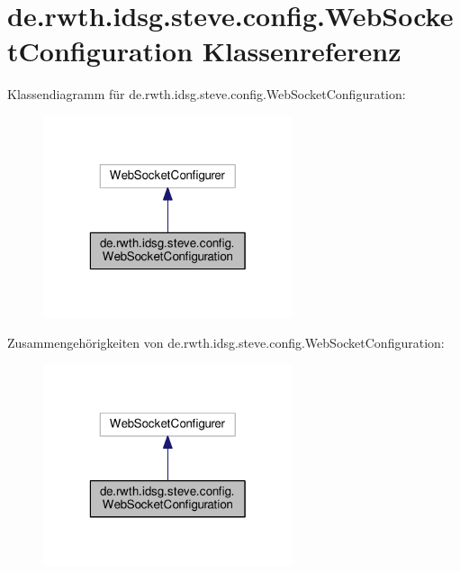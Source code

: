 \hypertarget{classde_1_1rwth_1_1idsg_1_1steve_1_1config_1_1_web_socket_configuration}{\section{de.\-rwth.\-idsg.\-steve.\-config.\-Web\-Socket\-Configuration Klassenreferenz}
\label{classde_1_1rwth_1_1idsg_1_1steve_1_1config_1_1_web_socket_configuration}
}


Klassendiagramm für de.\-rwth.\-idsg.\-steve.\-config.\-Web\-Socket\-Configuration\-:
\nopagebreak
\begin{figure}[H]
\begin{center}
\leavevmode
\includegraphics[width=208pt]{classde_1_1rwth_1_1idsg_1_1steve_1_1config_1_1_web_socket_configuration__inherit__graph}
\end{center}
\end{figure}


Zusammengehörigkeiten von de.\-rwth.\-idsg.\-steve.\-config.\-Web\-Socket\-Configuration\-:
\nopagebreak
\begin{figure}[H]
\begin{center}
\leavevmode
\includegraphics[width=208pt]{classde_1_1rwth_1_1idsg_1_1steve_1_1config_1_1_web_socket_configuration__coll__graph}
\end{center}
\end{figure}
